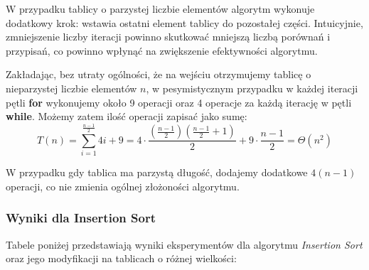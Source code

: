 \documentclass{article}
\begin{document}
W przypadku tablicy o parzystej liczbie elementów algorytm wykonuje dodatkowy krok: wstawia ostatni element tablicy do pozostałej części. Intuicyjnie, zmniejszenie liczby iteracji powinno skutkować mniejszą liczbą porównań i przypisań, co powinno wpłynąć na zwiększenie efektywności algorytmu.

Zakładając, bez utraty ogólności, że na wejściu otrzymujemy tablicę o nieparzystej liczbie elementów $n$, w pesymistycznym przypadku w każdej iteracji pętli \textbf{for} wykonujemy około 9 operacji oraz 4 operacje za każdą iterację w pętli \textbf{while}. Możemy zatem ilość operacji zapisać jako sumę:
\[
    T(n) = \sum_{i=1}^{\frac{n-1}{2}} 4i + 9 = 4 \cdot \frac{\left(\frac{n-1}{2}\right)\left(\frac{n-1}{2} + 1\right)}{2} + 9 \cdot \frac{n-1}{2} = \Theta(n^2)
\]

W przypadku gdy tablica ma parzystą długość, dodajemy dodatkowe $4(n-1)$ operacji, co nie zmienia ogólnej złożoności algorytmu.
\subsubsection{Wyniki dla Insertion Sort}
Tabele poniżej przedstawiają wyniki eksperymentów dla algorytmu \textit{Insertion Sort} oraz jego modyfikacji na tablicach o różnej wielkości:
\begin{table}[H]
    \centering
    \caption{Liczba operacji dla algorytmu \texttt{Insertion Sort} przy różnych rozmiarach tablicy}
    \label{tab:insertion_results}
\end{table}
\end{document}
